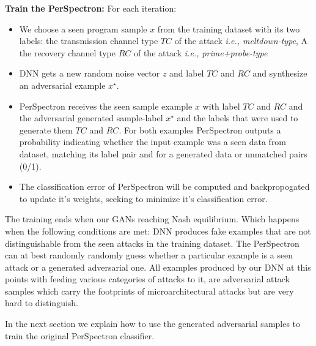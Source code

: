 
\noindent\textbf{Train the PerSpectron:}
For each iteration:

\begin{itemize} [topsep=0pt,parsep=0pt,partopsep=0pt, label={--}, leftmargin=*]
\item We choose a seen program sample $x$ from the training dataset with its two labels: the transmission channel type $TC$ of the attack {\em i.e., meltdown-type}, A the recovery channel type $RC$ of the attack {\em i.e., prime+probe-type} 
 
\item DNN gets a new random noise vector $z$ and label $TC$ and $RC$ and  synthesize an adversarial example  $x^{\star}$.
 
\item PerSpectron receives the seen sample example $x$ with label $TC$ and $RC$ and  the adversarial generated sample-label $x^{\star}$ and the labels that were used to generate them $TC$ and $RC$. For both examples PerSpectron outputs a probability  indicating whether the input example was a seen data from dataset, matching its label pair and  for a generated data or unmatched pairs (0/1). 
 
\item The classification error of PerSpectron will be computed and backpropogated  to update it's weights, seeking to minimize it's classification error. 
 
\end{itemize}

% 
The training ends when our GANs reaching Nash equilibrium. Which happens when the following conditions are met: DNN produces fake examples that are not distinguishable from the seen attacks in the training dataset. The PerSpectron can at best randomly  randomly guess whether a particular example is a seen attack or a generated adversarial one. All examples produced by our DNN at this points with feeding various categories of attacks to it, are adversarial attack samples which carry the footprints of microarchitectural attacks but are very hard to distinguish. 


In the next section we explain how to use the generated adversarial samples to train the original PerSpectron classifier. 

